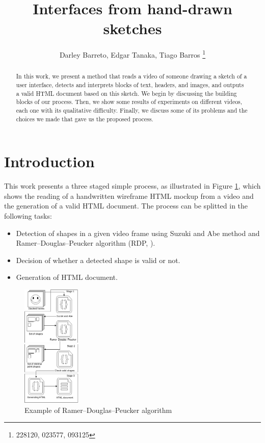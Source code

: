 \documentclass[]{IEEEtran}
\begin{document}
  \title{Interfaces from hand-drawn sketches}
  \author{Darley Barreto, Edgar Tanaka, Tiago Barros
    \thanks{228120, 023577, 093125}
  }
  \maketitle

  \begin{abstract}
    In this work, we present a method that reads a video of someone drawing a sketch of a user interface, detects and interprets blocks of text, headers, and images, and outputs a valid HTML document based on this sketch. We begin by discussing the building blocks of our process. Then, we show some results of experiments on different videos, each one with its qualitative difficulty. Finally, we discuss some of its problems and the choices we made that gave us the proposed process.

  \end{abstract}

  \section{Introduction}
    This work presents a three staged simple process, as illustrated in Figure \ref{process}, which shows the reading of a handwritten wireframe HTML mockup from a video and the generation of a valid HTML document. The process can be splitted in the following tasks:
    \begin{itemize}
    \item Detection of shapes in a given video frame using Suzuki and Abe \cite{suzuki85} method and Ramer–Douglas–Peucker algorithm (RDP, \cite{rdp}).
    \item Decision of whether a detected shape is valid or not.
    \item Generation of HTML document.
    \end{itemize}

   \begin{figure}[h]
   \centering
   \includegraphics[width=0.25\textwidth]{figures/diagram.png}
   \caption{\label{process} Example of Ramer–Douglas–Peucker algorithm}
  \end{figure}
\end{document}

